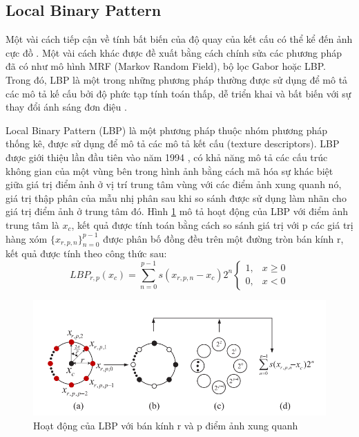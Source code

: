 \newpage
\subsection{Local Binary Pattern}
\label{sec:lbp}
Một vài cách tiếp cận về tính bất biến của độ quay của kết cấu có thể kể đến ảnh cực đồ \cite{polarograms}. Một vài cách khác được đề xuất bằng cách chính sửa các phương pháp đã có như mô hình MRF (Markov Random Field), bộ lọc Gabor hoặc LBP. Trong đó, LBP là một trong những phương pháp thường được sử dụng để mô tả các mô tả kế cấu bởi độ phức tạp tính toán thấp, dễ triển khai và bất biến với sự thay đổi ánh sáng đơn điệu \cite{Liu2016}.

Local Binary Pattern (LBP) là một phương pháp thuộc nhóm phương pháp thống kê, được sử dụng để mô tả các mô tả kết cấu (texture descriptors). LBP được giới thiệu lần đầu tiên vào năm 1994 \cite{firstLBP}, có khả năng mô tả các cấu trúc không gian của một vùng bên trong hình ảnh bằng cách mã hóa sự khác biệt giữa giá trị điểm ảnh ở vị trí trung tâm vùng với các điểm ảnh xung quanh nó, giá trị thập phân của mẫu nhị phân sau khi so sánh được sử dụng làm nhãn cho giá trị điểm ảnh ở trung tâm đó. Hình \ref{fig:lbp_oper} mô tả hoạt động của LBP với điểm ảnh trung tâm là  $x_c$, kết quả được tính toán bằng cách so sánh giá trị với p các giá trị hàng xóm $\{x_{r, p, n}\}_{n=0}^{p-1}$ được phân bố đồng đều trên một đường tròn bán kính r, kết quả được tính theo công thức sau:
\begin{equation}
	LBP_{r, p}(x_c) = \sum_{n=0}^{p-1}s(x_{r,p, n} -x_c)2^n 
\begin{cases} 
1, & x \geq 0 \\ 
0, & x < 0 
\end{cases}
\end{equation}


\begin{figure} [h]
	\centering
	\includegraphics[width= 1\linewidth]{figures/lbp_oper.png}
	\caption{Hoạt động của LBP với bán kính r và p điểm ảnh xung quanh \cite{Liu2016}}
	\label{fig:lbp_oper}
\end{figure} 


